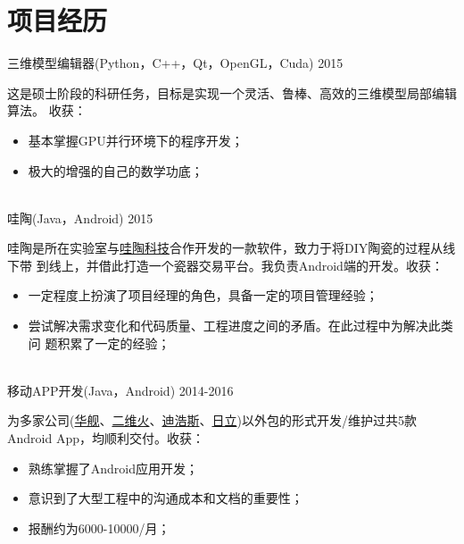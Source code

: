 \documentclass[]{friggeri-cv_cn} %
\begin{document}
\section{项目经历}
\begin{entrylist}

\entry
{三维模型编辑器(Python，C++，Qt，OpenGL，Cuda)}
{2015}
{这是硕士阶段的科研任务，目标是实现一个灵活、鲁棒、高效的三维模型局部编辑算法。
    收获：
\begin{itemize}

    \item 基本掌握GPU并行环境下的程序开发；
    \item 极大的增强的自己的数学功底；
\end{itemize}}
\\
\entry
{哇陶(Java，Android)}
{2015}
{哇陶是所在实验室与\href{http://wowtao.me/index.html}{哇陶科技}合作开发的一款软件，致力于将DIY陶瓷的过程从线下带
    到线上，并借此打造一个瓷器交易平台。我负责Android端的开发。收获：
\begin{itemize}
    \item 一定程度上扮演了项目经理的角色，具备一定的项目管理经验；
    \item 尝试解决需求变化和代码质量、工程进度之间的矛盾。在此过程中为解决此类问
        题积累了一定的经验；
\end{itemize}}
\\
\entry
{移动APP开发(Java，Android)}
{2014-2016}
{为多家公司(\href{http://www.hjtechcn.cn/}{华舰}、\href{http://www.2dfire.com/}{二维火}、\href{http://d-controls.com/}{迪浩斯}、\href{http://www.hisensehitachi.com/}{日立})以外包的形式开发/维护过共5款Android App，均顺利交付。收获：
\begin{itemize}
    \item 熟练掌握了Android应用开发；
    \item 意识到了大型工程中的沟通成本和文档的重要性；
    \item 报酬约为6000-10000/月；
\end{itemize}}

\end{entrylist}
\end{document}
